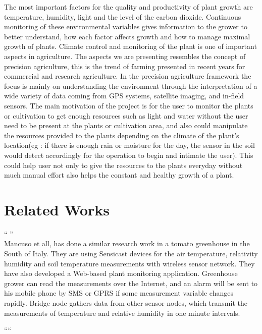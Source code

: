 \documentclass[10pt]{article}
\begin{document}
The most important factors for the quality and productivity of plant growth are temperature, humidity, light and the level of the carbon dioxide. 
Continuous monitoring of these environmental variables gives information to the grower to better understand, how each factor affects growth and how to manage maximal growth of plants. 
Climate control and monitoring of the plant is one of important aspects in agriculture. 
The aspects we are presenting resembles the concept of precision agriculture, this is the trend of farming presented in recent years for commercial and research agriculture. 
In the precision agriculture framework the focus is mainly on understanding the environment through the interpretation of a wide variety of data coming from GPS systems, satellite imaging, and in-field sensors. 
The main motivation of the project is for the user to monitor the plants or cultivation to get enough resources such as light and water without the user need to be present at the plants or cultivation area, and also could manipulate the resources provided to the plants depending on the climate of the plant’s location(eg : if there is enough rain or moisture for the day, the sensor in the soil would detect accordingly for the operation to begin and intimate the user).
This could help user not only to give the resources to the plants everyday without much manual effort also helps the constant and healthy growth of a plant.


\section*{Related Works}

“ ”\\


Mancuso et all, has done a similar research work in a tomato greenhouse in the South of Italy. 
They are using Sensicast devices for the air temperature, relativity humidity and soil temperature measurements with wireless sensor network. 
They have also developed a Web-based plant monitoring application. 
Greenhouse grower can read the measurements over the Internet, and an alarm will be sent to his mobile phone by SMS or GPRS if some measurement variable changes rapidly. 
Bridge node gathers data from other sensor nodes, which transmit the measurements of temperature and relative humidity in one minute intervals. 

““\\
\end{document}
